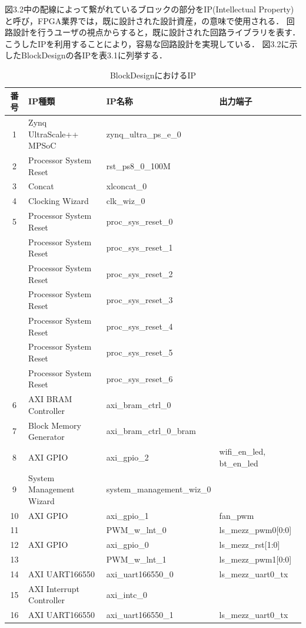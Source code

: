 \documentclass[11pt,a4j]{jreport}
\begin{document}
図3.2中の配線によって繋がれているブロックの部分をIP(Intellectual Property)
と呼び，FPGA業界では，既に設計された設計資産，の意味で使用される．
回路設計を行うユーザの視点からすると，既に設計された回路ライブラリを表す．
こうしたIPを利用することにより，容易な回路設計を実現している．
図3.2に示したBlockDesignの各IPを表3.1に列挙する．
\begin{table}[H]
  {\scriptsize
  \caption{BlockDesignにおけるIP}
  \label{table:SpeedOfLight}
  \centering
   \begin{tabular}{clll}
    \hline
    番号 & IP種類 & IP名称 & 出力端子 \\
    \hline \hline
    1 & Zynq UltraScale++ MPSoC & zynq_ultra_ps_e_0 & \\
    2 & Processor System Reset & rst_ps8_0_100M & \\
    3 & Concat & xlconcat_0 & \\
    4 & Clocking Wizard & clk_wiz_0 &\\
    5 & Processor System Reset & proc_sys_reset_0 & \\
     & Processor System Reset & proc_sys_reset_1 & \\
     & Processor System Reset & proc_sys_reset_2 & \\
     & Processor System Reset & proc_sys_reset_3 & \\
     & Processor System Reset & proc_sys_reset_4 & \\
     & Processor System Reset & proc_sys_reset_5 & \\
     & Processor System Reset & proc_sys_reset_6 & \\
    6 & AXI BRAM Controller & axi_bram_ctrl_0 & \\
    7 & Block Memory Generator & axi_bram_ctrl_0_bram & \\
    8 & AXI GPIO & axi_gpio_2 & wifi_en_led, bt_en_led\\
    9 & System Management Wizard & system_management_wiz_0 & \\
    10 & AXI GPIO & axi_gpio_1 & fan_pwm \\
    11 & & PWM_w_lnt_0 & ls_mezz_pwm0[0:0] \\
    12 & AXI GPIO & axi_gpio_0 & ls_mezz_rst[1:0] \\
    13 & & PWM_w_lnt_1 & ls_mezz_pwm1[0:0] \\
    14 & AXI UART166550 & axi_uart166550_0 & ls_mezz_uart0_tx \\
    15 & AXI Interrupt Controller & axi_intc_0 & \\
    16 & AXI UART166550 & axi_uart166550_1 & ls_mezz_uart0_tx \\

\end{tabular}}
\end{table}
\end{document}
